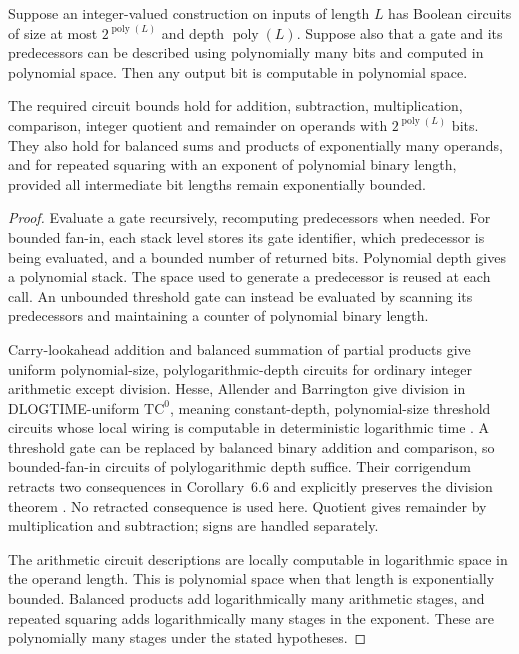 \begin{lemma}
\label{lem:implicit-arithmetic-space}
Suppose an integer-valued construction on inputs of length $L$ has Boolean circuits of size at most $2^{\operatorname{poly}(L)}$ and depth $\operatorname{poly}(L)$. Suppose also that a gate and its predecessors can be described using polynomially many bits and computed in polynomial space. Then any output bit is computable in polynomial space.

The required circuit bounds hold for addition, subtraction, multiplication, comparison, integer quotient and remainder on operands with $2^{\operatorname{poly}(L)}$ bits. They also hold for balanced sums and products of exponentially many operands, and for repeated squaring with an exponent of polynomial binary length, provided all intermediate bit lengths remain exponentially bounded.
\end{lemma}
\begin{proof}
Evaluate a gate recursively, recomputing predecessors when needed. For bounded fan-in, each stack level stores its gate identifier, which predecessor is being evaluated, and a bounded number of returned bits. Polynomial depth gives a polynomial stack. The space used to generate a predecessor is reused at each call. An unbounded threshold gate can instead be evaluated by scanning its predecessors and maintaining a counter of polynomial binary length.

Carry-lookahead addition and balanced summation of partial products give uniform polynomial-size, polylogarithmic-depth circuits for ordinary integer arithmetic except division. Hesse, Allender and Barrington give division in DLOGTIME-uniform $\mathrm{TC}^0$, meaning constant-depth, polynomial-size threshold circuits whose local wiring is computable in deterministic logarithmic time \citep[Corollary~6.3, author manuscript p.~16; uniformity conventions pp.~4--6]{HAB2002}. A threshold gate can be replaced by balanced binary addition and comparison, so bounded-fan-in circuits of polylogarithmic depth suffice. Their corrigendum retracts two consequences in Corollary~6.6 and explicitly preserves the division theorem \citep[pp.~1--2]{HABCorr2014}. No retracted consequence is used here. Quotient gives remainder by multiplication and subtraction; signs are handled separately.

The arithmetic circuit descriptions are locally computable in logarithmic space in the operand length. This is polynomial space when that length is exponentially bounded. Balanced products add logarithmically many arithmetic stages, and repeated squaring adds logarithmically many stages in the exponent. These are polynomially many stages under the stated hypotheses.
\end{proof}

